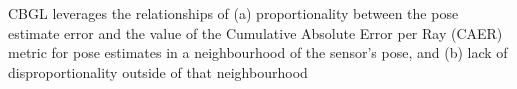 \lipsum[1]
CBGL leverages the relationships of (a) proportionality between the pose
estimate error and the value of the Cumulative Absolute Error per Ray (CAER)
metric for pose estimates in a neighbourhood of the sensor's pose, and (b) lack
of disproportionality outside of that neighbourhood
